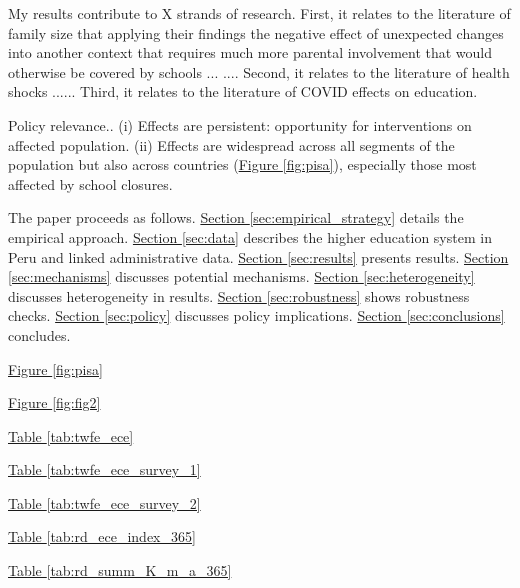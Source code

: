 My results contribute to X strands of research. First, it relates to the literature of family size that applying their findings the negative effect of unexpected changes into another context that requires much more parental involvement that would otherwise be covered by schools ... \cite{black_small_2010}.... Second, it relates to the literature of health shocks ...\cite{black_sibling_2021}... Third, it relates to the literature of COVID effects on education.





Policy relevance.. (i) Effects are persistent: opportunity for interventions on affected population. (ii) Effects are widespread across all segments of the population but also across countries (\hyperref[fig:pisa]{Figure \ref{fig:pisa}}), especially those most affected by school closures.



The paper proceeds as follows. \hyperref[sec:empirical_strategy]{Section \ref{sec:empirical_strategy}} details the empirical approach. \hyperref[sec:data]{Section \ref{sec:data}}  describes the higher education system in Peru and linked administrative data. \hyperref[sec:results]{Section \ref{sec:results}} presents results. \hyperref[sec:mechanisms]{Section \ref{sec:mechanisms}} discusses potential mechanisms. \hyperref[sec:heterogeneity]{Section \ref{sec:heterogeneity}} discusses heterogeneity in results. \hyperref[sec:robustness]{Section \ref{sec:robustness}} shows robustness checks. \hyperref[sec:policy]{Section \ref{sec:policy}} discusses policy implications. \hyperref[sec:conclusions]{Section \ref{sec:conclusions}} concludes.

\hyperref[fig:pisa]{Figure \ref{fig:pisa}}

\hyperref[fig:fig2]{Figure \ref{fig:fig2}}


\hyperref[tab:twfe_ece]{Table \ref{tab:twfe_ece}}

\hyperref[tab:twfe_ece_survey_1]{Table \ref{tab:twfe_ece_survey_1}}

\hyperref[tab:twfe_ece_survey_2]{Table \ref{tab:twfe_ece_survey_2}}

\hyperref[tab:rd_ece_index_365]{Table \ref{tab:rd_ece_index_365}}

\hyperref[tab:rd_summ_K_m_a_365]{Table \ref{tab:rd_summ_K_m_a_365}}

